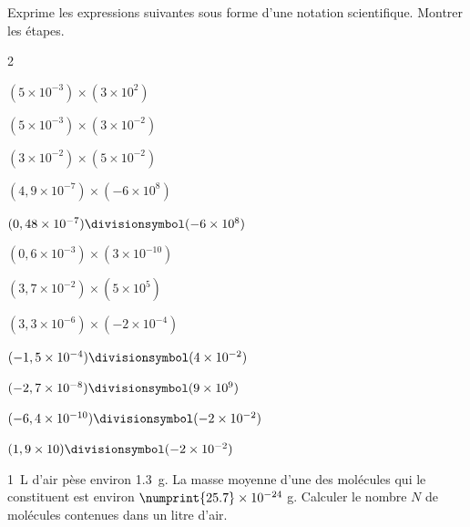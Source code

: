 \documentclass[main.tex]{subfiles}
\begin{document}
\newpage 
\begin{exercise} Exprime les expressions suivantes sous forme d'une notation scientifique. Montrer les étapes.
\begin{multicols}{2}
	\begin{enumerate}[label={$\Alph*=$\rule[-0.6em]{0em}{2.1em}},leftmargin=*] 
	\item $(5\times 10^{-3}) \times (3\times 10^{2}) $
	\item $(5\times 10^{-3}) \times (3\times 10^{-2}) $ 
	\item $(3\times 10^{-2}) \times (5\times 10^{-2}) $
	\item   $(4,9\times 10^{-7}) \times (-6\times 10^{8}) $
	\item  $(0,48\times 10^{-7}) \divisionsymbol (-6\times 10^{8}) $
	\item  $(0,6\times 10^{-3}) \times (3\times 10^{-10}) $
	\item   $(3,7\times 10^{-2}) \times (5\times 10^{5}) $
	\item   $(3,3\times 10^{-6}) \times (-2\times 10^{-4}) $
	\item   $(-1,5\times 10^{-4}) \divisionsymbol (4\times 10^{-2}) $
	\item   $(-2,7\times 10^{-8}) \divisionsymbol (9\times 10^{9}) $
	\item  $(-6,4\times 10^{-10}) \divisionsymbol (-2\times 10^{-2}) $
	\item   $(1,9\times 10 ) \divisionsymbol (-2\times 10^{-2}) $
	\end{enumerate}
\end{multicols} 
\end{exercise}  
\begin{exercise}\hfill 
	
	\SI{1}{\liter} d'air pèse environ \SI{1.3}{\gram}. La masse moyenne d'une des molécules qui le constituent est environ $\numprint{25.7}\times10^{-24}$ \si{\gram}. Calculer le nombre $N$ de molécules contenues dans un litre d'air.
\end{exercise}
\end{document}
